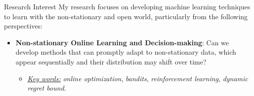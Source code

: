 \documentclass{resume} %
\begin{document}
\begin{rSection}{Research Interest}
My research focuses on developing machine learning techniques to learn with the non-stationary and open world, particularly from the following perspectives:	
\begin{itemize}
	\item \textbf{Non-stationary Online Learning and Decision-making}: Can we develop methods that can promptly adapt to non-stationary data, which appear sequentially and their distribution may shift over time?\vspace{-0.5mm} 
	\begin{itemize}
		\item \underline{\emph{Key words:}} \emph{online optimization}, \emph{bandits}, \emph{reinforcement learning}, \emph{dynamic regret bound}.
	\end{itemize}
	

\end{itemize}
\end{rSection}
\end{document}

